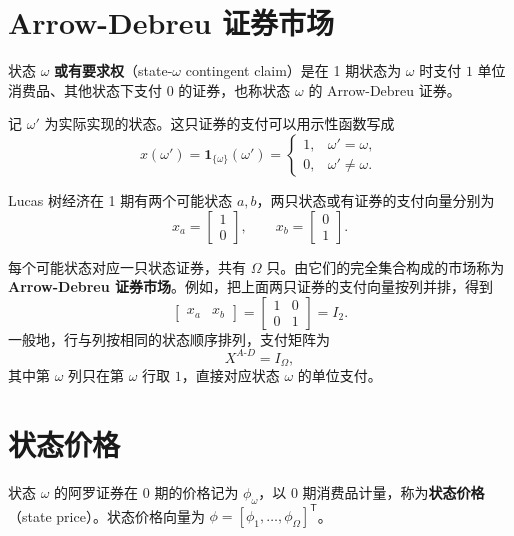 \section{Arrow-Debreu 证券市场}
\label{sec:wj-three-securities}
\begin{tcolorbox}[knowledge]
状态 $\omega$ \textbf{或有要求权}（state-$\omega$ contingent claim）是在 1 期状态为 $\omega$ 时支付 $1$ 单位消费品、其他状态下支付 $0$ 的证券，也称状态 $\omega$ 的 Arrow-Debreu 证券。
\end{tcolorbox}
记 $\omega'$ 为实际实现的状态。这只证券的支付可以用示性函数写成
\[
 x(\omega')=\mathbf{1}_{\{\omega\}}(\omega')=
 \begin{cases}1,&\omega'=\omega,\\0,&\omega'\ne\omega.\end{cases}
\]
\begin{tcolorbox}[example]
Lucas 树经济在 1 期有两个可能状态 $a,b$，两只状态或有证券的支付向量分别为
\[
 x_a=\begin{bmatrix}1\\0\end{bmatrix},\qquad
 x_b=\begin{bmatrix}0\\1\end{bmatrix}.
\]
\end{tcolorbox}
\begin{tcolorbox}[knowledge,title=Arrow-Debreu 市场与单位支付矩阵]
每个可能状态对应一只状态证券，共有 $\Omega$ 只。由它们的完全集合构成的市场称为 \textbf{Arrow-Debreu 证券市场}。例如，把上面两只证券的支付向量按列并排，得到
\[
 \begin{bmatrix}x_a & x_b\end{bmatrix}
 =\begin{bmatrix}1&0\\0&1\end{bmatrix}=I_2.
\]
一般地，行与列按相同的状态顺序排列，支付矩阵为
\[
 X^{A\text{-}D}=I_\Omega,
\]
其中第 $\omega$ 列只在第 $\omega$ 行取 $1$，直接对应状态 $\omega$ 的单位支付。
\end{tcolorbox}

\section{状态价格}
\label{sec:wj-three-prices}
\begin{tcolorbox}[knowledge,title=状态价格]
状态 $\omega$ 的阿罗证券在 0 期的价格记为 $\phi_\omega$，以 0 期消费品计量，称为\textbf{状态价格}（state price）。状态价格向量为 $\phi=[\phi_1,\ldots,\phi_\Omega]^{\mathsf T}$。
\end{tcolorbox}

